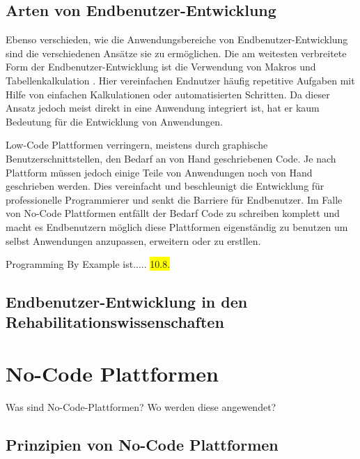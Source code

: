 \subsection{Arten von Endbenutzer-Entwicklung}

Ebenso verschieden, wie die Anwendungsbereiche von Endbenutzer-Entwicklung sind die verschiedenen Ansätze sie zu ermöglichen. Die am weitesten verbreitete Form der Endbenutzer-Entwicklung ist die Verwendung von Makros und Tabellenkalkulation \cite{Scaffidi2005EstimatingNEUP}. Hier vereinfachen Endnutzer häufig repetitive Aufgaben mit Hilfe von einfachen Kalkulationen oder automatisierten Schritten. Da dieser Ansatz jedoch meist direkt in eine Anwendung integriert ist, hat er kaum Bedeutung für die Entwicklung von Anwendungen.

Low-Code Plattformen verringern, meistens durch graphische Benutzerschnittstellen, den Bedarf an von Hand geschriebenen Code. Je nach Plattform müssen jedoch einige Teile von Anwendungen noch von Hand geschrieben werden. Dies vereinfacht und beschleunigt die Entwicklung für professionelle Programmierer und senkt die Barriere für Endbenutzer. Im Falle von No-Code Plattformen entfällt der Bedarf Code zu schreiben komplett und macht es Endbenutzern möglich diese Plattformen eigenständig zu benutzen um selbst Anwendungen anzupassen, erweitern oder zu erstllen. %

Programming By Example ist..... \colorbox{yellow}{10.8.}

\subsection{Endbenutzer-Entwicklung in den Rehabilitationswissenschaften}

\section{No-Code Plattformen} %
Was sind No-Code-Plattformen? Wo werden diese angewendet?

\subsection{Prinzipien von No-Code Plattformen}

